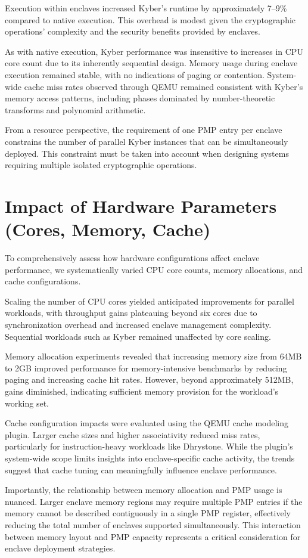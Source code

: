 Execution within enclaves increased Kyber’s runtime by approximately 7–9\% compared to native execution. This overhead is modest given the cryptographic operations’ complexity and the security benefits provided by enclaves.

As with native execution, Kyber performance was insensitive to increases in CPU core count due to its inherently sequential design. Memory usage during enclave execution remained stable, with no indications of paging or contention. System-wide cache miss rates observed through QEMU remained consistent with Kyber’s memory access patterns, including phases dominated by number-theoretic transforms and polynomial arithmetic.

From a resource perspective, the requirement of one PMP entry per enclave constrains the number of parallel Kyber instances that can be simultaneously deployed. This constraint must be taken into account when designing systems requiring multiple isolated cryptographic operations.

\section{Impact of Hardware Parameters (Cores, Memory, Cache)}

To comprehensively assess how hardware configurations affect enclave performance, we systematically varied CPU core counts, memory allocations, and cache configurations.

Scaling the number of CPU cores yielded anticipated improvements for parallel workloads, with throughput gains plateauing beyond six cores due to synchronization overhead and increased enclave management complexity. Sequential workloads such as Kyber remained unaffected by core scaling.

Memory allocation experiments revealed that increasing memory size from 64MB to 2GB improved performance for memory-intensive benchmarks by reducing paging and increasing cache hit rates. However, beyond approximately 512MB, gains diminished, indicating sufficient memory provision for the workload’s working set.

Cache configuration impacts were evaluated using the QEMU cache modeling plugin. Larger cache sizes and higher associativity reduced miss rates, particularly for instruction-heavy workloads like Dhrystone. While the plugin’s system-wide scope limits insights into enclave-specific cache activity, the trends suggest that cache tuning can meaningfully influence enclave performance.

Importantly, the relationship between memory allocation and PMP usage is nuanced. Larger enclave memory regions may require multiple PMP entries if the memory cannot be described contiguously in a single PMP register, effectively reducing the total number of enclaves supported simultaneously. This interaction between memory layout and PMP capacity represents a critical consideration for enclave deployment strategies.
